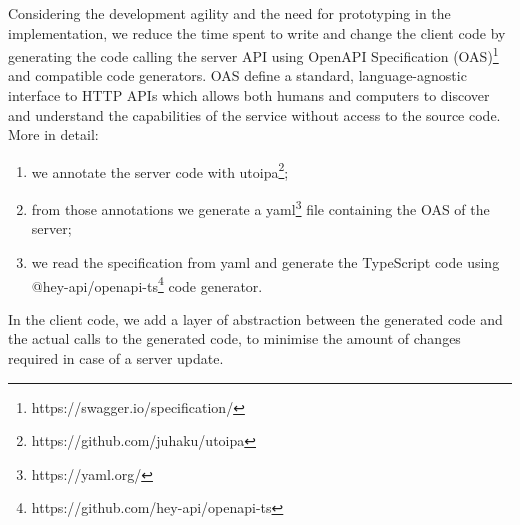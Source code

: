 Considering the development agility and the need for prototyping in the implementation, we reduce the time spent to write and change the client code by generating the code calling the server API using OpenAPI Specification (OAS)\footnote{https://swagger.io/specification/} and compatible code generators.
OAS define a standard, language-agnostic interface to HTTP APIs which allows both humans and computers to discover and understand the capabilities of the service without access to the source code.
More in detail:
\begin{enumerate}
    \item we annotate the server code with utoipa\footnote{https://github.com/juhaku/utoipa};
    \item from those annotations we generate a yaml\footnote{https://yaml.org/} file containing the OAS of the server;
    \item we read the specification from yaml and generate the TypeScript code using @hey-api/openapi-ts\footnote{https://github.com/hey-api/openapi-ts} code generator.
\end{enumerate}
In the client code, we add a layer of abstraction between the generated code and the actual calls to the generated code, to minimise the amount of changes required in case of a server update.

\begin{figure}
    
\end{figure}

